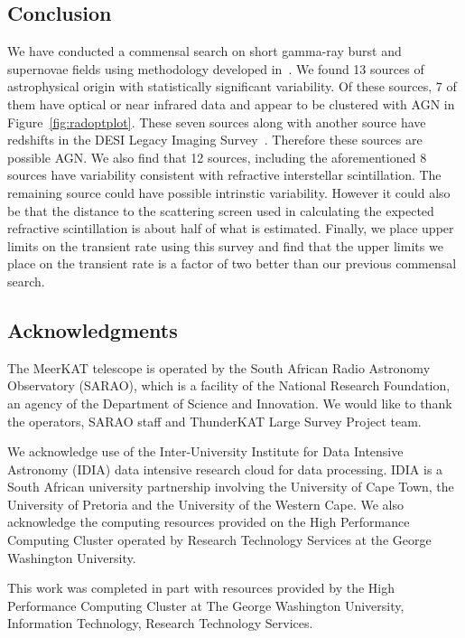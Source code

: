 \documentclass[12pt]{article}
\begin{document}
\subsection{Conclusion}
\label{sec:conclusion3}
We have conducted a commensal search on short gamma-ray burst and supernovae fields using methodology developed in~\citet{commensal1}. We found 13 sources of astrophysical origin with statistically significant variability. Of these sources, 7 of them have optical or near infrared data and appear to be clustered with AGN in Figure~\ref{fig:radoptplot}. These seven sources along with another source have redshifts in the DESI Legacy Imaging Survey~\citep{10.1093...mnras...stac608}. Therefore these sources are possible AGN. We also find that 12 sources, including the aforementioned 8 sources have variability consistent with refractive interstellar scintillation. The remaining source could have possible intrinstic variability. However it could also be that the distance to the scattering screen used in calculating the expected refractive scintillation is about half of what is estimated. Finally, we place upper limits on the transient rate using this survey and find that the upper limits we place on the transient rate is a factor of two better than our previous commensal search.






\subsection{Acknowledgments}
The MeerKAT telescope is operated by the South African Radio Astronomy Observatory (SARAO), which is a facility of the National Research Foundation, an agency of the Department of Science and Innovation. We would like to thank the operators, SARAO staff and ThunderKAT Large Survey Project team.

We acknowledge use of the Inter-University Institute for Data Intensive Astronomy (IDIA) data intensive research cloud for data processing. IDIA is a South African university partnership involving the University of Cape Town, the University of Pretoria and the University of the Western Cape. We also acknowledge the computing resources provided on the High Performance Computing Cluster operated by Research Technology Services at the George Washington University.

This work was completed in part with resources provided by the High Performance Computing Cluster at The George Washington University, Information Technology, Research Technology Services.
\end{document}

